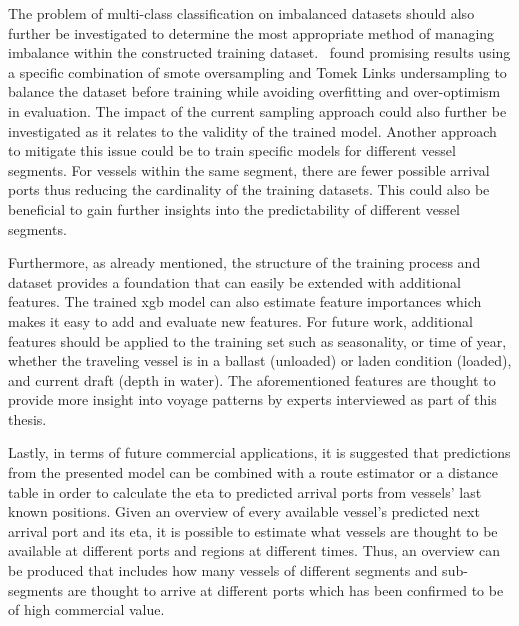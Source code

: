 The problem of multi-class classification on imbalanced datasets should also further be investigated to determine the most appropriate method of managing imbalance within the constructed training dataset.~\cite{cv_imbalance} found promising results using a specific combination of \acrshort{smote} oversampling and Tomek Links undersampling to balance the dataset before training while avoiding overfitting and over-optimism in evaluation. The impact of the current sampling approach could also further be investigated as it relates to the validity of the trained model. Another approach to mitigate this issue could be to train specific models for different vessel segments. For vessels within the same segment, there are fewer possible arrival ports thus reducing the cardinality of the training datasets. This could also be beneficial to gain further insights into the predictability of different vessel segments.

Furthermore, as already mentioned, the structure of the training process and dataset provides a foundation that can easily be extended with additional features. The trained \acrfull{xgb} model can also estimate feature importances which makes it easy to add and evaluate new features. For future work, additional features should be applied to the training set such as seasonality, or time of year, whether the traveling vessel is in a ballast (unloaded) or laden condition (loaded), and current draft (depth in water). The aforementioned features are thought to provide more insight into voyage patterns by experts interviewed as part of this thesis.

Lastly, in terms of future commercial applications, it is suggested that predictions from the presented model can be combined with a route estimator or a distance table in order to calculate the \acrfull{eta} to predicted arrival ports from vessels' last known positions. Given an overview of every available vessel's predicted next arrival port and its \acrshort{eta}, it is possible to estimate what vessels are thought to be available at different ports and regions at different times. Thus, an overview can be produced that includes how many vessels of different segments and sub-segments are thought to arrive at different ports which has been confirmed to be of high commercial value.
